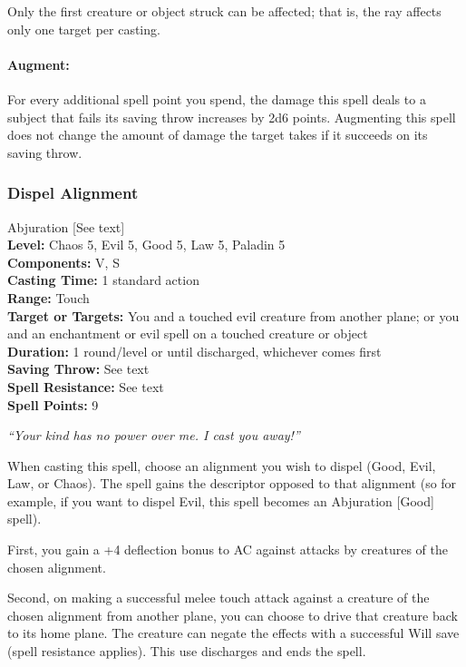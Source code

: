 Only the first creature or object struck can be affected; that is, the ray affects only one target per casting.

\paragraph{Augment:} For every additional spell point you spend, the damage this spell deals to a subject that fails its saving throw increases by 2d6 points. 
Augmenting this spell does not change the amount of damage the target takes if it succeeds on its saving throw. 
\subsubsection{Dispel Alignment}
\label{Spell:DispelAlignment}
Abjuration [See text]
\\ \textbf{Level:} Chaos 5, Evil 5, Good 5, Law 5, Paladin 5
\\ \textbf{Components:} V, S
\\ \textbf{Casting Time:} 1 standard action
\\ \textbf{Range:} Touch
\\ \textbf{Target or Targets:} You and a touched evil creature from another plane; or you and an enchantment or evil spell on a touched creature or object
\\ \textbf{Duration:} 1 round/level or until discharged, whichever comes first
\\ \textbf{Saving Throw:} See text
\\ \textbf{Spell Resistance:} See text
\\ \textbf{Spell Points:} 9

\emph{``Your kind has no power over me. I cast you away!''}

When casting this spell, choose an alignment you wish to dispel (Good, Evil, Law, or Chaos).
The spell gains the descriptor opposed to that alignment (so for example, if you want to dispel Evil, this spell becomes an Abjuration [Good] spell).

First, you gain a +4 deflection bonus to AC against attacks by creatures of the chosen alignment.

Second, on making a successful melee touch attack against a creature of the chosen alignment from another plane, you can choose to drive that creature back to its home plane. 
The creature can negate the effects with a successful Will save (spell resistance applies). 
This use discharges and ends the spell.

